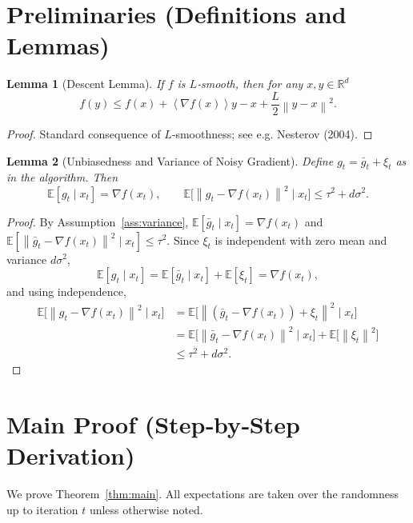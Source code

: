 \documentclass{article}
\newtheorem{lemma}{Lemma}
\newcommand{\E}{\mathbb{E}}
\newcommand{\R}{\mathbb{R}}
\newcommand{\norm}[1]{\left\|#1\right\|}
\newcommand{\inner}[1]{\left\langle#1\right\rangle}
\begin{document}
\newpage
\section*{Preliminaries (Definitions and Lemmas)}
\begin{lemma}[Descent Lemma]\label{lem:descent}
If $f$ is $L$‑smooth, then for any $x,y\in\R^{d}$
\[
f(y)\le f(x)+\inner{\nabla f(x)}{y-x}+\frac{L}{2}\norm{y-x}^{2}.
\]
\end{lemma}
\begin{proof}
Standard consequence of $L$‑smoothness; see e.g. Nesterov (2004). \qedhere
\end{proof}

\begin{lemma}[Unbiasedness and Variance of Noisy Gradient]\label{lem:unbias}
Define $g_{t}= \bar g_{t}+\xi_{t}$ as in the algorithm.
Then
\[
\E[g_{t}\mid x_{t}]=\nabla f(x_{t}),\qquad
\E\!\big[\norm{g_{t}-\nabla f(x_{t})}^{2}\mid x_{t}\big]
\le \tau^{2}+d\sigma^{2}.
\]
\end{lemma}
\begin{proof}
By Assumption~\ref{ass:variance},
$\E[\bar g_{t}\mid x_{t}]=\nabla f(x_{t})$ and
$\E[\norm{\bar g_{t}-\nabla f(x_{t})}^{2}\mid x_{t}]\le\tau^{2}$.
Since $\xi_{t}$ is independent with zero mean and variance $d\sigma^{2}$,
\[
\E[g_{t}\mid x_{t}]
= \E[\bar g_{t}\mid x_{t}]+\E[\xi_{t}]
= \nabla f(x_{t}),
\]
and using independence,
\[
\begin{aligned}
\E\!\big[\norm{g_{t}-\nabla f(x_{t})}^{2}\mid x_{t}\big]
&= \E\!\big[\norm{(\bar g_{t}-\nabla f(x_{t}))+\xi_{t}}^{2}\mid x_{t}\big]\\
&= \E\!\big[\norm{\bar g_{t}-\nabla f(x_{t})}^{2}\mid x_{t}\big]
   +\E\!\big[\norm{\xi_{t}}^{2}\big] \\
&\le \tau^{2}+d\sigma^{2}.
\end{aligned}
\]
\qedhere
\end{proof}

\section*{Main Proof (Step‑by‑Step Derivation)}
We prove Theorem~\ref{thm:main}.  All expectations are taken over the randomness
up to iteration $t$ unless otherwise noted.
\end{document}
